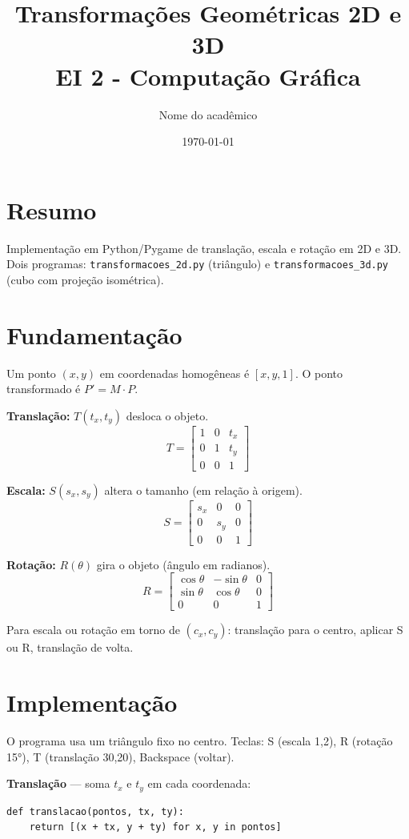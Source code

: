 \documentclass[12pt,a4paper]{article}
\title{Transformações Geométricas 2D e 3D \\ \small EI 2 - Computação Gráfica}
\author{Nome do acadêmico}
\date{\today}
\begin{document}
\maketitle

\section*{Resumo}
Implementação em Python/Pygame de translação, escala e rotação em 2D e 3D. Dois programas: \texttt{transformacoes\_2d.py} (triângulo) e \texttt{transformacoes\_3d.py} (cubo com projeção isométrica).

\section{Fundamentação}
Um ponto $(x,y)$ em coordenadas homogêneas é $[x, y, 1]$. O ponto transformado é $P' = M \cdot P$.

\textbf{Translação:} $T(t_x, t_y)$ desloca o objeto.
\[
T = \begin{bmatrix} 1 & 0 & t_x \\ 0 & 1 & t_y \\ 0 & 0 & 1 \end{bmatrix}
\]

\textbf{Escala:} $S(s_x, s_y)$ altera o tamanho (em relação à origem).
\[
S = \begin{bmatrix} s_x & 0 & 0 \\ 0 & s_y & 0 \\ 0 & 0 & 1 \end{bmatrix}
\]

\textbf{Rotação:} $R(\theta)$ gira o objeto (ângulo em radianos).
\[
R = \begin{bmatrix} \cos\theta & -\sin\theta & 0 \\ \sin\theta & \cos\theta & 0 \\ 0 & 0 & 1 \end{bmatrix}
\]

Para escala ou rotação em torno de $(c_x, c_y)$: translação para o centro, aplicar S ou R, translação de volta.

\section{Implementação}
O programa usa um triângulo fixo no centro. Teclas: S (escala 1,2), R (rotação 15°), T (translação 30,20), Backspace (voltar).

\textbf{Translação} — soma $t_x$ e $t_y$ em cada coordenada:
\begin{lstlisting}
def translacao(pontos, tx, ty):
    return [(x + tx, y + ty) for x, y in pontos]
\end{lstlisting}
\end{document}
